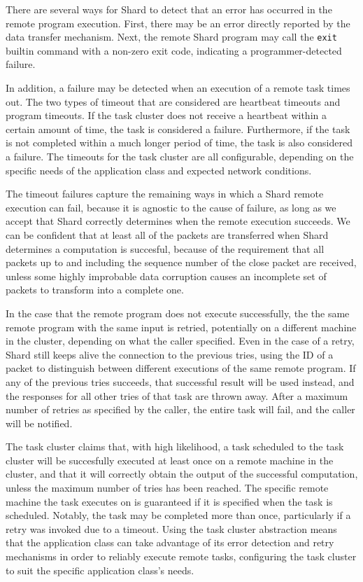 \documentclass[twoside]{report}
\begin{document}
There are several ways for Shard to detect that an error has occurred in the remote program execution.
First, there may be an error directly reported by the data transfer mechanism.
Next, the remote Shard program may call the \texttt{exit} builtin command with a non-zero exit code, indicating a programmer-detected failure.

In addition, a failure may be detected when an execution of a remote task times out.
The two types of timeout that are considered are heartbeat timeouts and program timeouts.
If the task cluster does not receive a heartbeat within a certain amount of time, the task is considered a failure.
Furthermore, if the task is not completed within a much longer period of time, the task is also considered a failure.
The timeouts for the task cluster are all configurable, depending on the specific needs of the application class and expected network conditions.

The timeout failures capture the remaining ways in which a Shard remote execution can fail, because it is agnostic to the cause of failure, as long as we accept that Shard correctly determines when the remote execution succeeds.
We can be confident that at least all of the packets are transferred when Shard determines a computation is succesful, because of the requirement that all packets up to and including the sequence number of the close packet are received, unless some highly improbable data corruption causes an incomplete set of packets to transform into a complete one.

In the case that the remote program does not execute successfully, the the same remote program with the same input is retried, potentially on a different machine in the cluster, depending on what the caller specified.
Even in the case of a retry, Shard still keeps alive the connection to the previous tries, using the ID of a packet to distinguish between different executions of the same remote program.
If any of the previous tries succeeds, that successful result will be used instead, and the responses for all other tries of that task are thrown away.
After a maximum number of retries as specified by the caller, the entire task will fail, and the caller will be notified.

The task cluster claims that, with high likelihood, a task scheduled to the task cluster will be succesfully executed at least once on a remote machine in the cluster, and that it will correctly obtain the output of the successful computation, unless the maximum number of tries has been reached.
The specific remote machine the task executes on is guaranteed if it is specified when the task is scheduled.
Notably, the task may be completed more than once, particularly if a retry was invoked due to a timeout.
Using the task cluster abstraction means that the application class can take advantage of its error detection and retry mechanisms in order to reliably execute remote tasks, configuring the task cluster to suit the specific application class's needs.
\end{document}
